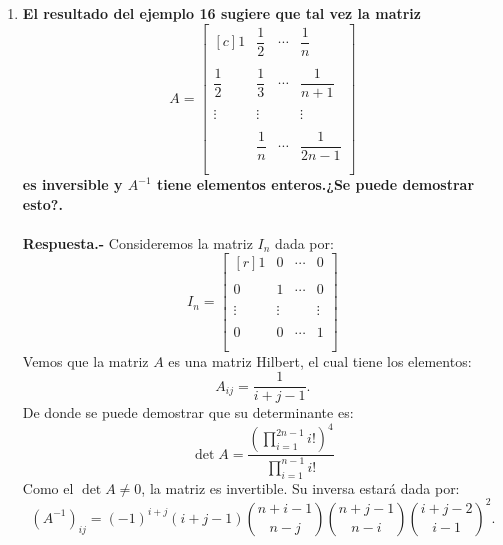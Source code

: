 \begin{enumerate}
    \item \textbf{\boldmath El resultado del ejemplo 16 sugiere que tal vez la matriz
	$$A=\begin{bmatrix*}[c]
	    1&\dfrac{1}{2}&\cdots&\dfrac{1}{n}\\\\
	    \dfrac{1}{2}&\dfrac{1}{3}&\cdots&\dfrac{1}{n+1}\\\\
	    \vdots&\vdots&&\vdots\\\\
		  &\dfrac{1}{n}&\cdots&\dfrac{1}{2n-1}\\\\
	\end{bmatrix*}$$
    es inversible y $A^{-1}$ tiene elementos enteros.¿Se puede demostrar esto?.\\\\
	Respuesta.-}\; Consideremos la matriz $I_n$ dada por:
	$$I_n=\begin{bmatrix*}[r]
	    1&0&\cdots&0\\\\
	    0&1&\cdots&0\\\\
	    \vdots&\vdots&&\vdots\\\\
	    0&0&\cdots&1\\\\
	\end{bmatrix*}$$
	Vemos que la matriz $A$ es una matriz Hilbert, el cual tiene los elementos:
	$$A_{ij}=\dfrac{1}{i+j-1}.$$
	De donde se puede demostrar que su determinante es:
	$$\det A = \dfrac{\left(\displaystyle\prod_{i=1}^{2n-1}i!\right)^4}{\displaystyle \prod_{i=1}^{n-1}i!}$$
	Como el $\det A \neq 0$, la matriz es invertible. Su inversa estará dada por:
	$$\left(A^{-1}\right)_{ij}=\left(-1\right)^{i+j}\left(i+j-1\right){n+i-1\choose n-j}{n+j-1 \choose n-i}{i+j-2 \choose i-1}^2.$$


\end{enumerate}
